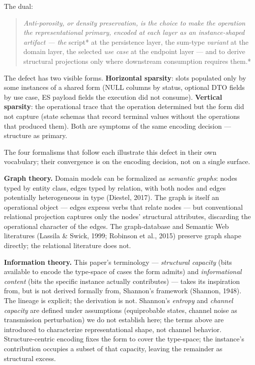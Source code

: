 \documentclass[
]{article}
\begin{document}
The dual:

\begin{quote}
\emph{Anti-porosity, or density preservation, is the choice to make the
operation the representational primary, encoded at each layer as an
instance-shaped artifact --- the }script* at the persistence layer, the
sum-type \emph{variant} at the domain layer, the selected \emph{use
case} at the endpoint layer --- and to derive structural projections
only where downstream consumption requires them.*
\end{quote}

The defect has two visible forms. \textbf{Horizontal sparsity}: slots
populated only by some instances of a shared form (NULL columns by
status, optional DTO fields by use case, ES payload fields the execution
did not consume). \textbf{Vertical sparsity}: the operational trace that
the operation determined but the form did not capture (state schemas
that record terminal values without the operations that produced them).
Both are symptoms of the same encoding decision --- structure as
primary.

The four formalisms that follow each illustrate this defect in their own
vocabulary; their convergence is on the encoding decision, not on a
single surface.

\textbf{Graph theory.} Domain models can be formalized as \emph{semantic
graphs}: nodes typed by entity class, edges typed by relation, with both
nodes and edges potentially heterogeneous in type (Diestel, 2017). The
graph is itself an operational object --- edges express verbs that
relate nodes --- but conventional relational projection captures only
the nodes' structural attributes, discarding the operational character
of the edges. The graph-database and Semantic Web literatures (Lassila
\& Swick, 1999; Robinson et al., 2015) preserve graph shape directly;
the relational literature does not.

\textbf{Information theory.} This paper's terminology ---
\emph{structural capacity} (bits available to encode the type-space of
cases the form admits) and \emph{informational content} (bits the
specific instance actually contributes) --- takes its inspiration from,
but is not derived formally from, Shannon's framework (Shannon, 1948).
The lineage is explicit; the derivation is not. Shannon's \emph{entropy}
and \emph{channel capacity} are defined under assumptions (equiprobable
states, channel noise as transmission perturbation) we do not establish
here; the terms above are introduced to characterize representational
shape, not channel behavior. Structure-centric encoding fixes the form
to cover the type-space; the instance's contribution occupies a subset
of that capacity, leaving the remainder as structural excess.
\end{document}
